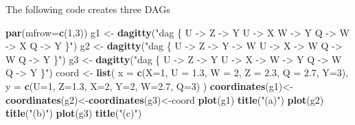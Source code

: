 \documentclass[
]{book}
\newenvironment{Shaded}{\begin{snugshade}}{\end{snugshade}}
\newcommand{\AttributeTok}[1]{\textcolor[rgb]{0.13,0.29,0.53}{#1}}
\newcommand{\DecValTok}[1]{\textcolor[rgb]{0.00,0.00,0.81}{#1}}
\newcommand{\FloatTok}[1]{\textcolor[rgb]{0.00,0.00,0.81}{#1}}
\newcommand{\FunctionTok}[1]{\textcolor[rgb]{0.13,0.29,0.53}{\textbf{#1}}}
\newcommand{\NormalTok}[1]{#1}
\newcommand{\OtherTok}[1]{\textcolor[rgb]{0.56,0.35,0.01}{#1}}
\newcommand{\StringTok}[1]{\textcolor[rgb]{0.31,0.60,0.02}{#1}}
\begin{document}
The following code creates three DAGs

\begin{Shaded}
\begin{Highlighting}[]
\FunctionTok{par}\NormalTok{(}\AttributeTok{mfrow=}\FunctionTok{c}\NormalTok{(}\DecValTok{1}\NormalTok{,}\DecValTok{3}\NormalTok{))}
\NormalTok{g1 }\OtherTok{\textless{}{-}} \FunctionTok{dagitty}\NormalTok{(}\StringTok{"dag \{}
\StringTok{    U {-}\textgreater{} Z {-}\textgreater{} Y }
\StringTok{    U {-}\textgreater{} X}
\StringTok{    W {-}\textgreater{} Y}
\StringTok{    Q {-}\textgreater{} W {-}\textgreater{} X}
\StringTok{    Q {-}\textgreater{} Y}
\StringTok{    \}"}\NormalTok{)}
\NormalTok{g2 }\OtherTok{\textless{}{-}} \FunctionTok{dagitty}\NormalTok{(}\StringTok{"dag \{}
\StringTok{    U {-}\textgreater{} Z {-}\textgreater{} Y {-}\textgreater{} W }
\StringTok{    U {-}\textgreater{} X {-}\textgreater{} W }
\StringTok{    Q {-}\textgreater{} W}
\StringTok{    Q {-}\textgreater{} Y}
\StringTok{    \}"}\NormalTok{)}
\NormalTok{g3 }\OtherTok{\textless{}{-}} \FunctionTok{dagitty}\NormalTok{(}\StringTok{"dag \{}
\StringTok{    U {-}\textgreater{} Z {-}\textgreater{} Y }
\StringTok{    U {-}\textgreater{} X {-}\textgreater{} W  {-}\textgreater{} Y}
\StringTok{    Q {-}\textgreater{} W}
\StringTok{    Q {-}\textgreater{} Y}
\StringTok{    \}"}\NormalTok{)}
\NormalTok{coord }\OtherTok{\textless{}{-}} 
  \FunctionTok{list}\NormalTok{( }\AttributeTok{x =} \FunctionTok{c}\NormalTok{(}\AttributeTok{X=}\DecValTok{1}\NormalTok{, }\AttributeTok{U =} \FloatTok{1.3}\NormalTok{, }\AttributeTok{W =} \DecValTok{2}\NormalTok{, }\AttributeTok{Z =} \FloatTok{2.3}\NormalTok{, }\AttributeTok{Q =} \FloatTok{2.7}\NormalTok{, }\AttributeTok{Y=}\DecValTok{3}\NormalTok{), }
        \AttributeTok{y =} \FunctionTok{c}\NormalTok{(}\AttributeTok{U=}\DecValTok{1}\NormalTok{,   }\AttributeTok{Z=}\FloatTok{1.3}\NormalTok{, }\AttributeTok{X=}\DecValTok{2}\NormalTok{, }\AttributeTok{Y=}\DecValTok{2}\NormalTok{,   }\AttributeTok{W=}\FloatTok{2.7}\NormalTok{,  }\AttributeTok{Q=}\DecValTok{3}\NormalTok{)}
\NormalTok{  )}
\FunctionTok{coordinates}\NormalTok{(g1)}\OtherTok{\textless{}{-}}\FunctionTok{coordinates}\NormalTok{(g2)}\OtherTok{\textless{}{-}}\FunctionTok{coordinates}\NormalTok{(g3)}\OtherTok{\textless{}{-}}\NormalTok{coord}
\FunctionTok{plot}\NormalTok{(g1)}
\FunctionTok{title}\NormalTok{(}\StringTok{"(a)"}\NormalTok{)}
\FunctionTok{plot}\NormalTok{(g2)}
\FunctionTok{title}\NormalTok{(}\StringTok{"(b)"}\NormalTok{)}
\FunctionTok{plot}\NormalTok{(g3)}
\FunctionTok{title}\NormalTok{(}\StringTok{"(c)"}\NormalTok{)}
\end{Highlighting}
\end{Shaded}
\end{document}
